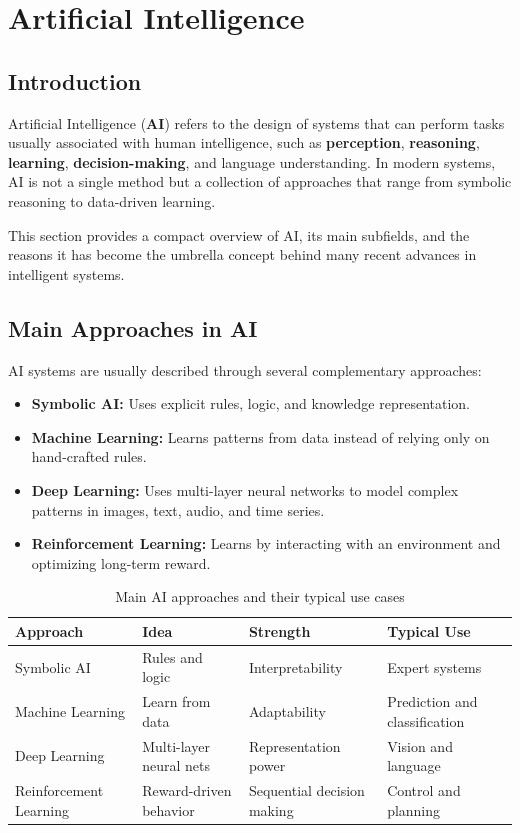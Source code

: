 \section{Artificial Intelligence}
\label{sec:artificial_intelligence}

\subsection*{Introduction}
Artificial Intelligence (\textbf{AI}) refers to the design of systems that can perform tasks usually associated with human intelligence, such as \textbf{perception}, \textbf{reasoning}, \textbf{learning}, \textbf{decision-making}, and language understanding. In modern systems, AI is not a single method but a collection of approaches that range from symbolic reasoning to data-driven learning.

This section provides a compact overview of AI, its main subfields, and the reasons it has become the umbrella concept behind many recent advances in intelligent systems.

\subsection{Main Approaches in AI}
AI systems are usually described through several complementary approaches:

\begin{itemize}
\item \textbf{Symbolic AI:} Uses explicit rules, logic, and knowledge representation.
\item \textbf{Machine Learning:} Learns patterns from data instead of relying only on hand-crafted rules.
\item \textbf{Deep Learning:} Uses multi-layer neural networks to model complex patterns in images, text, audio, and time series.
\item \textbf{Reinforcement Learning:} Learns by interacting with an environment and optimizing long-term reward.
\end{itemize}

\begin{table}[h]
\centering
\caption{Main AI approaches and their typical use cases}
\begin{tabular}{|l|l|l|l|}
\hline
\textbf{Approach} & \textbf{Idea} & \textbf{Strength} & \textbf{Typical Use} \\ \hline
Symbolic AI & Rules and logic & Interpretability & Expert systems \\ \hline
Machine Learning & Learn from data & Adaptability & Prediction and classification \\ \hline
Deep Learning & Multi-layer neural nets & Representation power & Vision and language \\ \hline
Reinforcement Learning & Reward-driven behavior & Sequential decision making & Control and planning \\ \hline
\end{tabular}
\label{tab:ai_approaches}
\end{table}

